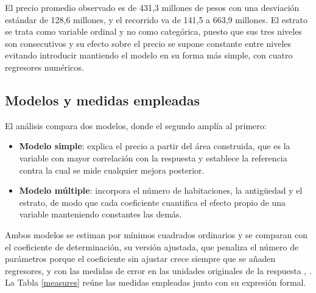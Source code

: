         El precio promedio observado es de 431,3 millones de pesos con una
        desviación estándar de 128,6 millones, y el recorrido va de 141,5 a 
        663,9 millones. El estrato se trata como variable ordinal y no como 
        categórica, puesto que sus tres niveles son consecutivos y su efecto 
        sobre el precio se supone constante entre niveles evitando introducir 
        mantiendo el modelo en su forma más simple, con cuatro regresores 
        numéricos.

    \subsection{Modelos y medidas empleadas}
        El análisis compara dos modelos, donde el segundo amplía al primero:

        \vspace{10pt}

        \begin{itemize}
            \item \textbf{Modelo simple}: explica el precio a partir del área 
            construida, que es la variable con mayor correlación con la
            respuesta y establece la referencia contra la cual se mide cualquier
            mejora posterior.

            \item \textbf{Modelo múltiple}: incorpora el número de habitaciones, 
            la antigüedad y el estrato, de modo que cada coeficiente cuantifica 
            el efecto propio de una variable manteniendo constantes las demás.
        \end{itemize}

        \vspace{10pt}

        Ambos modelos se estiman por mínimos cuadrados ordinarios y se comparan
        con el coeficiente de determinación, su versión ajustada, que penaliza el
        número de parámetros porque el coeficiente sin ajustar crece siempre que
        se añaden regresores, y con las medidas de error en las unidades
        originales de la respuesta \cite{hastie2009elements}, \cite{james2023islp}.
        La Tabla \ref{measures} reúne las medidas empleadas junto con su expresión
        formal.

